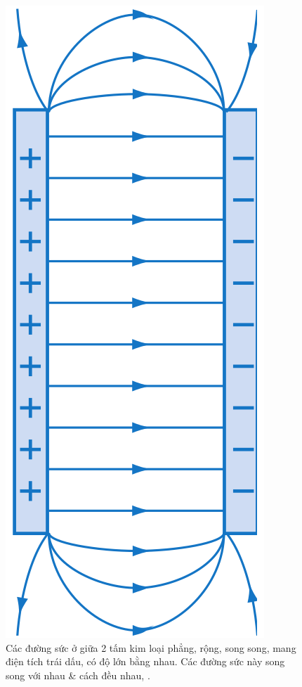 \documentclass[oneside]{book}
\numberwithin{equation}{section}
\begin{document}
\begin{figure}[H]
	\centering
	\includegraphics[scale=0.15]{duong_suc_dien_truong_deu}
	\caption{Các đường sức ở giữa 2 tấm kim loại phẳng, rộng, song song, mang điện tích trái dấu, có độ lớn bằng nhau. Các đường sức này song song với nhau \& cách đều nhau, \cite[Hình 3.8, p. 16]{SGK_Vat_Ly_11_nang_cao}.}
	\label{fig:duong suc dien truong deu}
\end{figure}
\end{document}
